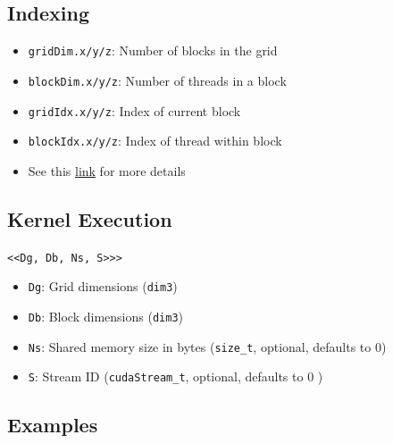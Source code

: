 \documentclass{article}
\begin{document}
\subsection{Indexing}
\begin{itemize}
    \item \texttt{gridDim.x/y/z}: Number of blocks in the grid
    \item \texttt{blockDim.x/y/z}: Number of threads in a block 
    \item \texttt{gridIdx.x/y/z}: Index of current block 
    \item \texttt{blockIdx.x/y/z}: Index of thread within block
    \item See this \href{https://www.eecs.umich.edu/courses/eecs498-APP/resources/materials/CUDA-Thread-Indexing-Cheatsheet.pdf}{link} for more details
\end{itemize}

\subsection{Kernel Execution}
\texttt{<<Dg, Db, Ns, S>>>}
\begin{itemize}
    \item \texttt{Dg}: Grid dimensions (\texttt{dim3})
    \item \texttt{Db}: Block dimensions (\texttt{dim3})
    \item \texttt{Ns}: Shared memory size in bytes (\texttt{size\_t}, optional, defaults to 0)
    \item \texttt{S}: Stream ID (\texttt{cudaStream\_t}, optional, defaults to 0
    )
\end{itemize}

\subsection{Examples}
\end{document}
